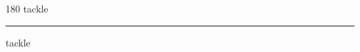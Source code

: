 
\begin{frame}
\begin{center}
\begin{turn}{180}
{\fontsize{2.5cm}{1em}\selectfont tackle}
\end{turn}
\vspace{1em}\par  
\hrule
\vspace{1em}\par  
{\fontsize{2.5cm}{1em}\selectfont tackle}
\end{center}
\end{frame}
